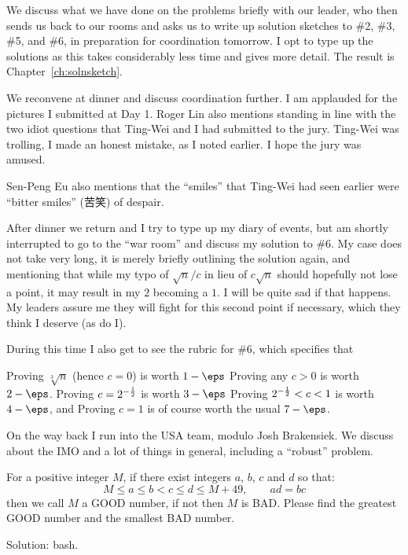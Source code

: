 \documentclass[11pt]{scrreprt}
\numberwithin{figure}{chapter}
\begin{document}
We discuss what we have done on the problems briefly with our leader, who then sends us back to our
rooms and asks us to write up solution sketches to \#2, \#3, \#5, and \#6,
in preparation for coordination tomorrow.
I opt to type up the solutions as this takes considerably less time and gives more detail.
The result is Chapter~\ref{ch:solnsketch}.

We reconvene at dinner and discuss coordination further.
I am applauded for the pictures I submitted at Day 1.
Roger Lin also mentions standing in line with the two idiot questions that Ting-Wei and I
had submitted to the jury. Ting-Wei was trolling, I made an honest mistake, as I noted earlier.
I hope the jury was amused.

Sen-Peng Eu also mentions that the ``smiles'' that Ting-Wei had seen earlier
were ``bitter smiles'' (苦笑) of despair.

After dinner we return and I try to type up my diary of events,
but am shortly interrupted to go to the ``war room''
and discuss my solution to \#6.
My case does not take very long, it is merely briefly outlining the solution again,
and mentioning that while my typo of $\sqrt n / c$ in lieu of $c \sqrt n$ should hopefully not lose a point,
it
may result in my $2$ becoming a $1$. I will be quite sad if that happens.
My leaders assure me they will fight for this second point if necessary, which they think I deserve (as do I).

During this time I also get to see the rubric for \#6, which specifies that
\begin{itemize}
  \ii Proving $\sqrt[3]{n}$ (hence $c=0$) is worth $1 - \eps$
  \ii Proving any $c > 0$ is worth $2 - \eps$.
  \ii Proving $c = 2^{-\frac{1}{2}}$ is worth $3 - \eps$
  \ii Proving $2^{-\frac{1}{2}} < c < 1$ is worth $4 - \eps$, and
  \ii Proving $c=1$ is of course worth the usual $7 - \eps$.
\end{itemize}

On the way back I run into the USA team, modulo Josh Brakensiek.
We discuss about the IMO and a lot of things in general, including a ``robust'' problem.
\begin{problem*}
  For a positive integer $M$, if there exist integers $a$, $b$, $c$ and $d$ so that:
  \[ M \leq a \leq b < c \leq d \leq M+49, \qquad ad=bc \]
  then we call $M$ a GOOD number, if not then $M$ is BAD.
  Please find the greatest GOOD number and the smallest BAD number.
\end{problem*}
Solution: bash.
\end{document}
